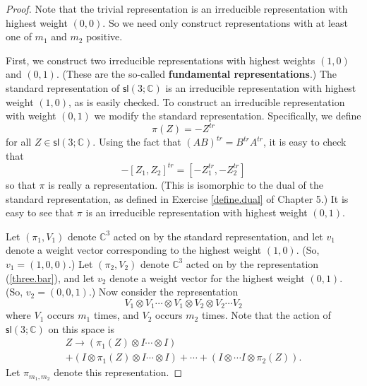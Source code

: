 \documentclass[12pt]{amsbook}
\theoremstyle{plain}
\numberwithin{equation}{chapter}
\numberwithin{theorem}{chapter}
\begin{document}
\begin{proof}
Note that the trivial representation is an irreducible representation with
highest weight $\left(  0,0\right)  $. So we need only construct
representations with at least one of $m_{1}$ and $m_{2}$ positive.

First, we construct two irreducible representations with highest weights
$\left(  1,0\right)  $ and $\left(  0,1\right)  $. (These are the so-called
\textbf{fundamental representations}.) The standard representation of
$\mathsf{sl}\left(  3;\mathbb{C}\right)  $ is an irreducible representation
with highest weight $\left(  1,0\right)  $, as is easily checked. To construct
an irreducible representation with weight $\left(  0,1\right)  $ we modify the
standard representation. Specifically, we define
\begin{equation}
\pi(Z)=-Z^{tr}\label{three.bar}%
\end{equation}
for all $Z\in\mathsf{sl}\left(  3;\mathbb{C}\right)  $. Using the fact that
$\left(  AB\right)  ^{tr}=B^{tr}A^{tr}$, it is easy to check that
\[
-\left[  Z_{1},Z_{2}\right]  ^{tr}=\left[  -Z_{1}^{tr},-Z_{2}^{tr}\right]
\]
so that $\pi$ is really a representation. (This is isomorphic to the dual of
the standard representation, as defined in Exercise \ref{define.dual} of
Chapter 5.) It is easy to see that $\pi$ is an irreducible representation with
highest weight $\left(  0,1\right)  $.

Let $\left(  \pi_{1},V_{1}\right)  $ denote $\mathbb{C}^{3}$ acted on by the
standard representation, and let $v_{1}$ denote a weight vector corresponding
to the highest weight $\left(  1,0\right)  $. (So, $v_{1}=(1,0,0)$.) Let
$\left(  \pi_{2},V_{2}\right)  $ denote $\mathbb{C}^{3}$ acted on by the
representation (\ref{three.bar}), and let $v_{2}$ denote a weight vector for
the highest weight $\left(  0,1\right)  $. (So, $v_{2}=(0,0,1)$.) Now consider
the representation
\[
V_{1}\otimes V_{1}\cdots\otimes V_{1}\otimes V_{2}\otimes V_{2}\cdots V_{2}%
\]
where $V_{1}$ occurs $m_{1}$ times, and $V_{2}$ occurs $m_{2}$ times. Note
that the action of $\mathsf{sl}\left(  3;\mathbb{C}\right)  $ on this space
is
\begin{align}
Z\rightarrow\left(  \pi_{1}(Z)\otimes I\cdots\otimes I\right)  \nonumber\\
+\left(  I\otimes\pi_{1}(Z)\otimes I\cdots\otimes I\right)  +\cdots+\left(
I\otimes\cdots I\otimes\pi_{2}(Z)\right)  \text{.}\label{tensor.n.m}%
\end{align}
Let $\pi_{m_{1},m_{2}}$ denote this representation.


\end{proof}
\end{document}
